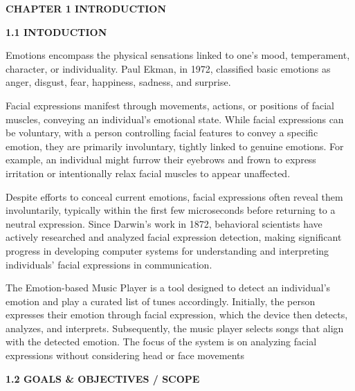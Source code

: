 \documentclass[a4paper]{article}
\begin{document}
\bigskip


\bigskip


\bigskip


\bigskip


\bigskip

\clearpage\setcounter{page}{1}\pagestyle{Convertedvi}
{\bfseries
\hypertarget{gjdgxs}{}CHAPTER 1 INTRODUCTION}

{\bfseries
\hypertarget{30j0zll}{}1.1 INTODUCTION}

Emotions encompass the physical sensations linked to one's mood, temperament, character, or individuality. Paul Ekman,
in 1972, classified basic emotions as anger, disgust, fear, happiness, sadness, and surprise.

Facial expressions manifest through movements, actions, or positions of facial muscles, conveying an individual's
emotional state. While facial expressions can be voluntary, with a person controlling facial features to convey a
specific emotion, they are primarily involuntary, tightly linked to genuine emotions. For example, an individual might
furrow their eyebrows and frown to express irritation or intentionally relax facial muscles to appear unaffected.

Despite efforts to conceal current emotions, facial expressions often reveal them involuntarily, typically within the
first few microseconds before returning to a neutral expression. Since Darwin's work in 1872, behavioral scientists
have actively researched and analyzed facial expression detection, making significant progress in developing computer
systems for understanding and interpreting individuals' facial expressions in communication.

The {\textquotedbl}Emotion-based Music Player{\textquotedbl} is a tool designed to detect an individual's emotion and
play a curated list of tunes accordingly. Initially, the person expresses their emotion through facial expression,
which the device then detects, analyzes, and interprets. Subsequently, the music player selects songs that align with
the detected emotion. The focus of the system is on analyzing facial expressions without considering head or face
movements

{\bfseries
\hypertarget{1fob9te}{}1.2 GOALS \& OBJECTIVES / SCOPE}
\end{document}

